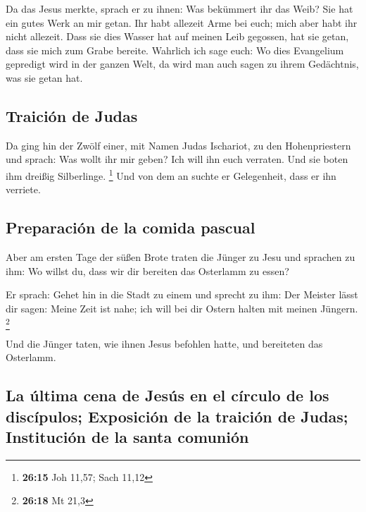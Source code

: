  Da das Jesus merkte, sprach er zu ihnen: Was bekümmert
ihr das Weib? Sie hat ein gutes Werk an mir getan.  Ihr
habt allezeit Arme bei euch; mich aber habt ihr nicht allezeit.
 Dass sie dies Wasser hat auf meinen Leib gegossen, hat
sie getan, dass sie mich zum Grabe bereite.  Wahrlich ich
sage euch: Wo dies Evangelium gepredigt wird in der ganzen Welt, da wird
man auch sagen zu ihrem Gedächtnis, was sie getan hat.

\hypertarget{traiciuxf3n-de-judas}{%
\subsection{Traición de Judas}\label{traiciuxf3n-de-judas}}

 Da ging hin der Zwölf einer, mit Namen Judas Ischariot,
zu den Hohenpriestern  und sprach: Was wollt ihr mir
geben? Ich will ihn euch verraten. Und sie boten ihm dreißig
Silberlinge. \footnote{\textbf{26:15} Joh 11,57; Sach 11,12}
 Und von dem an suchte er Gelegenheit, dass er ihn
verriete.

\hypertarget{preparaciuxf3n-de-la-comida-pascual}{%
\subsection{Preparación de la comida
pascual}\label{preparaciuxf3n-de-la-comida-pascual}}

 Aber am ersten Tage der süßen Brote traten die Jünger zu
Jesu und sprachen zu ihm: Wo willst du, dass wir dir bereiten das
Osterlamm zu essen?

 Er sprach: Gehet hin in die Stadt zu einem und sprecht
zu ihm: Der Meister lässt dir sagen: Meine Zeit ist nahe; ich will bei
dir Ostern halten mit meinen Jüngern. \footnote{\textbf{26:18} Mt 21,3}

 Und die Jünger taten, wie ihnen Jesus befohlen hatte,
und bereiteten das Osterlamm.

\hypertarget{la-uxfaltima-cena-de-jesuxfas-en-el-cuxedrculo-de-los-discuxedpulos-exposiciuxf3n-de-la-traiciuxf3n-de-judas-instituciuxf3n-de-la-santa-comuniuxf3n}{%
\subsection{La última cena de Jesús en el círculo de los discípulos;
Exposición de la traición de Judas; Institución de la santa
comunión}\label{la-uxfaltima-cena-de-jesuxfas-en-el-cuxedrculo-de-los-discuxedpulos-exposiciuxf3n-de-la-traiciuxf3n-de-judas-instituciuxf3n-de-la-santa-comuniuxf3n}}

